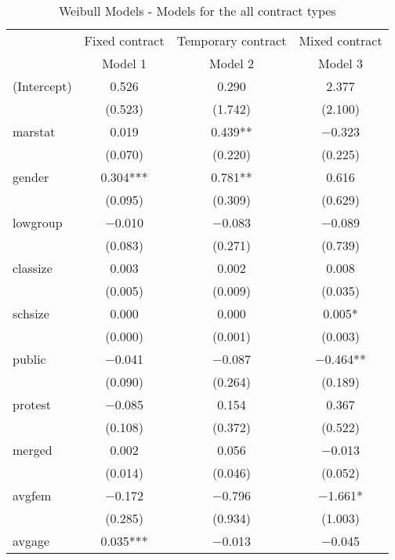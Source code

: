 \documentclass[
]{article}
\begin{document}
\begin{table}[!h]

\caption{\label{tab:unnamed-chunk-15}Weibull Models - Models for the all contract types}
\centering
\fontsize{8}{10}\selectfont
\begin{tabular}[t]{lccc}
\toprule
\multicolumn{1}{c}{ } & \multicolumn{1}{c}{Fixed contract } & \multicolumn{1}{c}{Temporary contract} & \multicolumn{1}{c}{Mixed contract} \\
\cmidrule(l{3pt}r{3pt}){2-2} \cmidrule(l{3pt}r{3pt}){3-3} \cmidrule(l{3pt}r{3pt}){4-4}
  & Model 1 & Model 2 & Model 3\\
\midrule
(Intercept) & \num{0.526} & \num{0.290} & \num{2.377}\\
 & (\num{0.523}) & (\num{1.742}) & (\num{2.100})\\
marstat & \num{0.019} & \num{0.439}** & \num{-0.323}\\
 & (\num{0.070}) & (\num{0.220}) & (\num{0.225})\\
gender & \num{0.304}*** & \num{0.781}** & \num{0.616}\\
 & (\num{0.095}) & (\num{0.309}) & (\num{0.629})\\
lowgroup & \num{-0.010} & \num{-0.083} & \num{-0.089}\\
 & (\num{0.083}) & (\num{0.271}) & (\num{0.739})\\
classize & \num{0.003} & \num{0.002} & \num{0.008}\\
 & (\num{0.005}) & (\num{0.009}) & (\num{0.035})\\
schsize & \num{0.000} & \num{0.000} & \num{0.005}*\\
 & (\num{0.000}) & (\num{0.001}) & (\num{0.003})\\
public & \num{-0.041} & \num{-0.087} & \num{-0.464}**\\
 & (\num{0.090}) & (\num{0.264}) & (\num{0.189})\\
protest & \num{-0.085} & \num{0.154} & \num{0.367}\\
 & (\num{0.108}) & (\num{0.372}) & (\num{0.522})\\
merged & \num{0.002} & \num{0.056} & \num{-0.013}\\
 & (\num{0.014}) & (\num{0.046}) & (\num{0.052})\\
avgfem & \num{-0.172} & \num{-0.796} & \num{-1.661}*\\
 & (\num{0.285}) & (\num{0.934}) & (\num{1.003})\\
avgage & \num{0.035}*** & \num{-0.013} & \num{-0.045}\\

\end{tabular}
\end{table}
\end{document}
